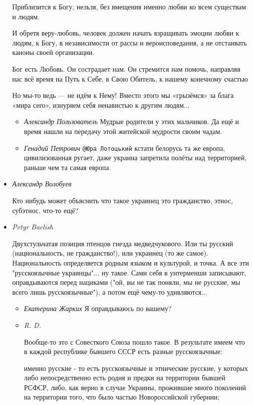\begin{itemize}
Приблизится к Богу, нельзя, без вмещения именно любви ко всем существам и
людям.

И обретя веру-любовь, человек должен начать взращивать эмоции любви к людям, к
Богу, в независимости от рассы и вероисповедания, а не отстаивать каноны своей
организации.

Бог есть Любовь. Он сострадает нам. Он стремится нам помочь, направляя нас всё
время на Путь к Себе, в Свою Обитель, к нашему конечному счастью

Но мы-то ведь — не идём к Нему! Вместо этого мы «грызёмся» за блага «мира
сего», изнуряем себя ненавистью к другим людям...

\begin{itemize}
\item \emph{Александр Пользователь}
Мудрые родители у этих мальчиков. Да ещё и время нашли на передачу этой
житейской мудрости своим чадам.🙂

\item \emph{Генадий Петрович}
\verb|@Юра Лотоцький|  кстати белорусь та же европа, цивилизованная ругает,
даже украина запретила полёты над территорией, раньше чем та самая европа.
\end{itemize}

\item \emph{Александр Волобуев}

Кто нибудь может объяснить что такое украинец это гражданство, этнос, субэтнос,
что-то ещё?

\item \emph{Petyr Baelish}

Двухстульчатая позиция птенцов гнезда медведчукового. Или ты русский
(национальность, не гражданство!), или украинец (то же самое). Национальность
определяется родным языком и культурой, и точка. А все эти "русскоязычные
украинцы"... ну такое. Сами себя в унтерменши записывают, оправдываются перед
нациками ("ой, вы не так поняли, мы не русские, мы всего лишь русскоязычные"),
а потом ещё чему-то удивляются...

\begin{itemize}
\item \emph{Екатерина Жарких}
Я оправдываюсь по вашему?

\item \emph{R. D.}

Вообще-то это с Совесткого Союза пошло такое. В результате имеем что в каждой
республике бывшего СССР есть разные русскоязычные: 

именно русские - то есть русскоязычные и этнические русские, у которых либо
непосредственно есть родня и предки на территории бывшей РСФСР, либо, как верно
в случае Украины, прожившие много поколений на территории того, что было частью
Новороссийской губернии; 


\end{itemize}
\end{itemize}
